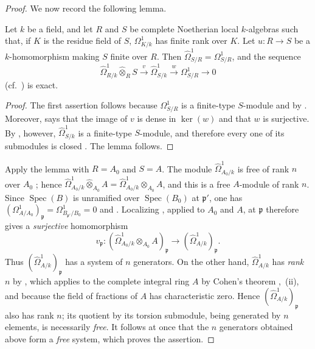 \begin{proof}
We now record the following lemma.

\begin{lemma}[18.11.3.5]
\label{IV.18.11.3.5}
Let $k$ be a field, and let $R$ and $S$ be complete Noetherian local $k$-algebras such that, if $K$ is the residue field of $S$, $\Omega^1_{K/k}$ has finite rank over $K$. Let $u:R\to S$ be a $k$-homomorphism making $S$ finite over $R$. Then $\hat{\Omega}^1_{S/R}=\Omega^1_{S/R}$, and the sequence
\begin{equation}
\label{IV.18.11.3.6}
\tag{18.11.3.6}
  \hat{\Omega}^1_{R/k}\widehat{\otimes}_{R}S\xrightarrow{v}\hat{\Omega}^1_{S/k}\xrightarrow{w}\Omega^1_{S/R}\to 0
\end{equation}
(cf.\ ) is exact.
\end{lemma}

\begin{proof}
The first assertion follows because $\Omega^1_{S/R}$ is a finite-type $S$-module  and by . Moreover,  says that the image of $v$ is dense in $\ker(w)$ and that $w$ is surjective. By , however, $\hat{\Omega}^1_{S/k}$ is a finite-type $S$-module, and therefore every one of its submodules is closed . The lemma follows.
\end{proof}

Apply the lemma with $R=A_0$ and $S=A$. The module $\hat{\Omega}^1_{A_0/k}$ is free of rank $n$ over $A_0$ ; hence
$\hat{\Omega}^1_{A_0/k}\widehat{\otimes}_{A_0}A=\hat{\Omega}^1_{A_0/k}\otimes_{A_0}A$, and this is a free $A$-module of rank $n$. Since $\operatorname{Spec}(B)$ is unramified over $\operatorname{Spec}(B_0)$ at $\mathfrak{p}'$, one has
$(\Omega^1_{A/A_0})_{\mathfrak{p}}=\Omega^1_{B_{\mathfrak{p}'}/B_0}=0$  and . Localizing , applied to $A_0$ and $A$, at $\mathfrak{p}$ therefore gives a \emph{surjective} homomorphism
\[
  v_{\mathfrak{p}}:(\hat{\Omega}^1_{A_0/k}\otimes_{A_0}A)_{\mathfrak{p}}
  \longrightarrow(\hat{\Omega}^1_{A/k})_{\mathfrak{p}}.
\]
Thus $(\hat{\Omega}^1_{A/k})_{\mathfrak{p}}$ has a system of $n$ generators. On the other hand, $\hat{\Omega}^1_{A/k}$ has \emph{rank $n$} by , which applies to the complete integral ring $A$ by Cohen's theorem ,~(ii), and because the field of fractions of $A$ has characteristic zero. Hence $(\hat{\Omega}^1_{A/k})_{\mathfrak{p}}$ also has rank $n$; its quotient by its torsion submodule, being generated by $n$ elements, is necessarily \emph{free}. It follows at once that the $n$ generators obtained above form a \emph{free} system, which proves the assertion.
\end{proof}

